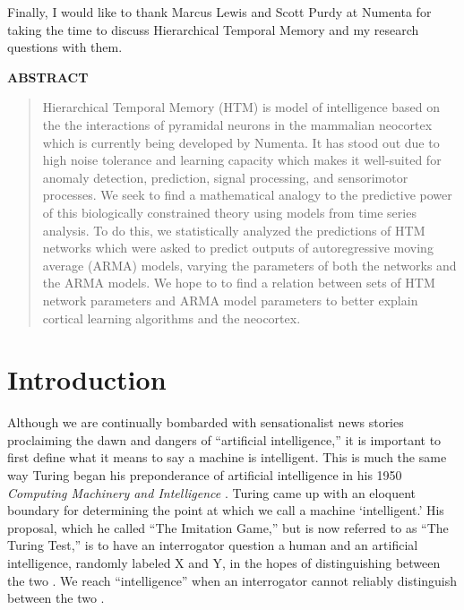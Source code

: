 \documentclass[oneside,12pt,openany]{book}
\begin{document}
	Finally, I would like to thank Marcus Lewis and Scott Purdy at Numenta for taking the time to discuss Hierarchical Temporal Memory and my research questions with them.
	\vfill
	\pagebreak
	
	\begin{center}
		\textbf{ABSTRACT}
		
		\begin{quotation}
			\noindent Hierarchical Temporal Memory (HTM) is model of intelligence based on the the interactions of pyramidal neurons in the mammalian neocortex which is currently being developed by Numenta. It has stood out due to high noise tolerance and learning capacity which makes it well-suited for anomaly detection, prediction, signal processing, and sensorimotor processes. We seek to find a mathematical analogy to the predictive power of this biologically constrained theory using models from time series analysis. To do this, we statistically analyzed the predictions of HTM networks which were asked to predict outputs of autoregressive moving average (ARMA) models, varying the parameters of both the networks and the ARMA models. We hope to to find a relation between sets of HTM network parameters and ARMA model parameters to better explain cortical learning algorithms and the neocortex.
		\end{quotation}

		
	\end{center}

	\vfill
	\pagebreak
	\vfill
	\pagebreak
	\setcounter{tocdepth}{1}
	\listoffigures
	\vfill
	\pagebreak
	
	\listoftables
	\vfill

	\pagebreak
	
	\mainmatter
	\chapter{Introduction}
	
	Although we are continually bombarded with sensationalist news stories proclaiming the dawn and dangers of ``artificial intelligence,'' it is important to first define what it means to say a machine is intelligent. This is much the same way Turing began his preponderance of artificial intelligence in his 1950 \textit{Computing Machinery and Intelligence} \cite{Turing}. Turing came up with an eloquent boundary for determining the point at which we call a machine `intelligent.' His proposal, which he called ``The Imitation Game,'' but is now referred to as ``The Turing Test,'' is to have an interrogator question a human and an artificial intelligence, randomly labeled X and Y, in the hopes of distinguishing between the two \cite{Turing}. We reach ``intelligence'' when an interrogator cannot reliably distinguish between the two \cite{Turing}.
	
\end{document}
